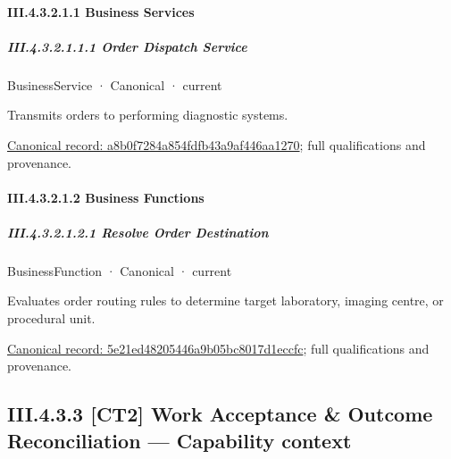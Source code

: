 \paragraph*{III.4.3.2.1.1 Business Services}
\label{navigation:III.4.3.2.1.1}

\subparagraph*{III.4.3.2.1.1.1 Order Dispatch Service}
\label{navigation:III.4.3.2.1.1.1}

\label{element:a8b0f7284a854fdfb43a9af446aa1270}
{\small BusinessService · Canonical · current}\par

Transmits orders to performing diagnostic systems.


{\footnotesize \href{../../../../continuum/business/business-service/a8b0f7284a854fdfb43a9af446aa1270.md}{Canonical record: a8b0f7284a854fdfb43a9af446aa1270}; full qualifications and provenance.}\par
\paragraph*{III.4.3.2.1.2 Business Functions}
\label{navigation:III.4.3.2.1.2}

\subparagraph*{III.4.3.2.1.2.1 Resolve Order Destination}
\label{navigation:III.4.3.2.1.2.1}

\label{element:5e21ed48205446a9b05bc8017d1eccfc}
{\small BusinessFunction · Canonical · current}\par

Evaluates order routing rules to determine target laboratory, imaging centre, or procedural unit.


{\footnotesize \href{../../../../continuum/business/business-function/5e21ed48205446a9b05bc8017d1eccfc.md}{Canonical record: 5e21ed48205446a9b05bc8017d1eccfc}; full qualifications and provenance.}\par
\subsection*{III.4.3.3 [CT2] Work Acceptance \& Outcome Reconciliation — Capability context}
\label{navigation:III.4.3.3}


